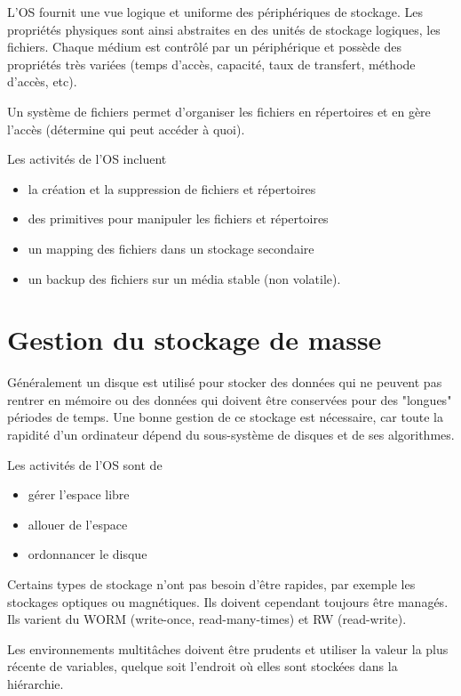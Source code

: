 L'OS fournit une vue logique et uniforme des périphériques de stockage. Les propriétés physiques sont ainsi abstraites en des unités de stockage logiques, les fichiers. Chaque médium est contrôlé par un périphérique et possède des propriétés très variées (temps d'accès, capacité, taux de transfert, méthode d'accès, etc).

Un système de fichiers permet d'organiser les fichiers en répertoires et en gère l'accès (détermine qui peut accéder à quoi).

Les activités de l'OS incluent

\begin{itemize}
	\item la création et la suppression de fichiers et répertoires
	\item des primitives pour manipuler les fichiers et répertoires
	\item un mapping des fichiers dans un stockage secondaire
	\item un backup des fichiers sur un média stable (non volatile).
\end{itemize}

\section{Gestion du stockage de masse}

Généralement un disque est utilisé pour stocker des données qui ne peuvent pas rentrer en mémoire ou des données qui doivent être conservées pour des "longues" périodes de temps. Une bonne gestion de ce stockage est nécessaire, car toute la rapidité d'un ordinateur dépend du sous-système de disques et de ses algorithmes.

Les activités de l'OS sont de

\begin{itemize}
	\item gérer l'espace libre
	\item allouer de l'espace
	\item ordonnancer le disque
\end{itemize}

Certains types de stockage n'ont pas besoin d'être rapides, par exemple les stockages optiques ou magnétiques. Ils doivent cependant toujours être managés. Ils varient du WORM (write-once, read-many-times) et RW (read-write).


Les environnements multitâches doivent être prudents et utiliser la valeur la plus récente de variables, quelque soit l'endroit où elles sont stockées dans la hiérarchie.

